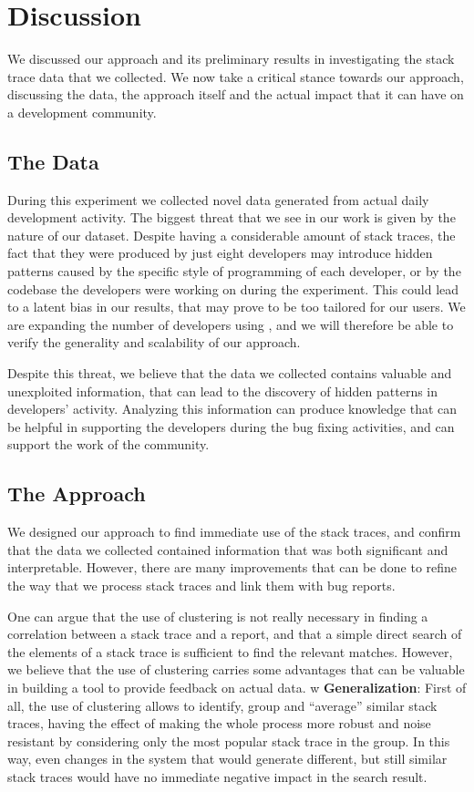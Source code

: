 \section{Discussion}\label{sec:discussion}

We discussed our approach and its preliminary results in investigating the stack trace data that we collected. We now take a critical stance towards our approach, discussing the data, the approach itself and the actual impact that it can have on a development community.

\subsection{The Data}

During this experiment we collected novel data generated from actual daily development activity. The biggest threat that we see in our work is given by the nature of our dataset. Despite having a considerable amount of stack traces, the fact that they were produced by just eight developers may introduce hidden patterns caused by the specific style of programming of each developer, or by the codebase the developers were working on during the experiment. This could lead to a latent bias in our results, that may prove to be too tailored for our users. We are expanding the number of developers using \shr, and we will therefore be able to verify the generality and scalability of our approach. 

Despite this threat, we believe that the data we collected contains valuable and unexploited information, that can lead to the discovery of hidden patterns in developers' activity. Analyzing this information can produce knowledge that can be helpful in supporting the developers during the bug fixing activities, and can support the work of the community.

\subsection{The Approach}

We designed our approach to find immediate use of the stack traces, and confirm that the data we collected contained information that was both significant and interpretable. However, there are many improvements that can be done to refine the way that we process stack traces  and link them with bug reports.

One can argue that the use of clustering is not really necessary in finding a correlation between a stack trace and a report, and that a simple direct search of the elements of a stack trace is sufficient to find the relevant matches. However, we believe that the use of clustering carries some advantages that can be valuable in building a tool to provide feedback on actual data.
w
\textbf{Generalization}: First of all, the use of clustering allows to identify, group and ``average'' similar stack traces, having the effect of making the whole process more robust and noise resistant by considering only the most popular stack trace in the group. In this way, even changes in the system that would generate different, but still similar stack traces would have no immediate negative impact in the search result.

